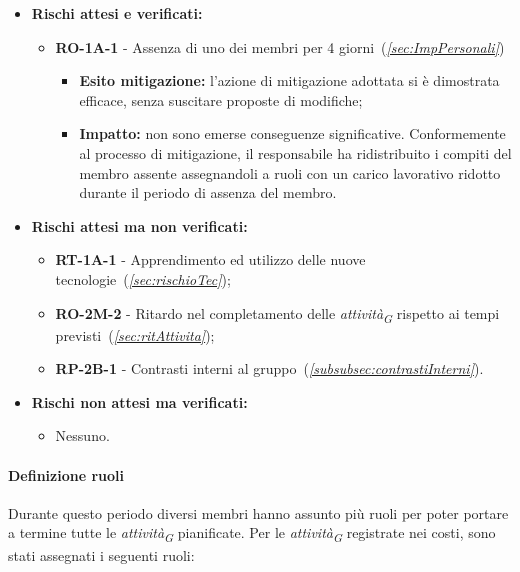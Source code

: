 \begin{itemize}
    \item \textbf{Rischi attesi e verificati:}
\begin{itemize}
    \item \textbf{RO-1A-1} - Assenza di uno dei membri per 4 giorni~(\textit{\ref{sec:ImpPersonali}})
    \begin{itemize}
        \item \textbf{Esito mitigazione:} 
        l'azione di mitigazione adottata si è dimostrata efficace, senza suscitare proposte di modifiche;
        \item \textbf{Impatto:}
        non sono emerse conseguenze significative. Conformemente al processo di mitigazione, il responsabile ha ridistribuito i compiti del membro assente assegnandoli a ruoli con un carico lavorativo ridotto durante il periodo di assenza del membro.
    \end{itemize}
\end{itemize}
\item \textbf{Rischi attesi ma non verificati:}
 \begin{itemize}
    \item \textbf{RT-1A-1} - Apprendimento ed utilizzo delle nuove tecnologie~(\textit{\ref{sec:rischioTec}});
    \item \textbf{RO-2M-2} - Ritardo nel completamento delle \textit{attività}\textsubscript{\textit{G}} rispetto ai tempi previsti~(\textit{\ref{sec:ritAttivita}});
    \item \textbf{RP-2B-1} - Contrasti interni al gruppo~(\textit{\ref{subsubsec:contrastiInterni}}).
\end{itemize}
\item \textbf{Rischi non attesi ma verificati:}
\begin{itemize}
    \item Nessuno.
\end{itemize}
\end{itemize}

\pagebreak

\paragraph{Definizione ruoli}
Durante questo periodo diversi membri hanno assunto più ruoli per poter portare a termine tutte le \textit{attività}\textsubscript{\textit{G}} pianificate.
Per le \textit{attività}\textsubscript{\textit{G}} registrate nei costi, sono stati assegnati i seguenti ruoli:

